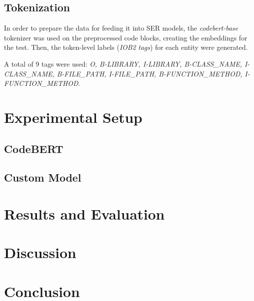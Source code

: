 \documentclass{article}
\begin{document}
\subsection{Tokenization}
\FloatBarrier
In order to prepare the data for feeding it into SER models, the \textit{codebert-base} tokenizer was 
used on the preprocessed code blocks, creating the embeddings for the test. Then, 
the token-level labels (\textit{IOB2 tags}) for each entity were generated.

A total of 9 tags were used: \textit{O, B-LIBRARY, I-LIBRARY, B-CLASS\_NAME, I-CLASS\_NAME, B-FILE\_PATH, I-FILE\_PATH, B-FUNCTION\_METHOD, I-FUNCTION\_METHOD}.

\begin{table}[ht]
    \centering
    \caption{Tokenization and IOB Tagging Output}
\end{table}
\FloatBarrier

\section{Experimental Setup}
\subsection{CodeBERT}
\subsection{Custom Model}

\section{Results and Evaluation}
\section{Discussion}

\section{Conclusion}
\end{document}
